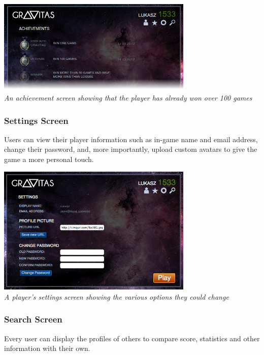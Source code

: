 \documentclass[a4wide, 11pt]{article}
\begin{document}
\begin{center}

    \includegraphics[width=0.7\textwidth]{images/acheivement.png} \\
  \emph{An achievement screen showing that the player has already won over 100 games}
\end{center}

\subsubsection{Settings Screen}
Users can view their player information such as in-game name and email address, change their password, and, more importantly, upload custom avatars to give the game a more personal touch.

\begin{center}

    \includegraphics[width=0.7\textwidth]{images/settings.png} \\
  \emph{A player's settings screen showing the various options they could change}
\end{center}


\subsubsection{Search Screen}
Every user can display the profiles of others to compare score, statistics and other information with their own.
\end{document}
